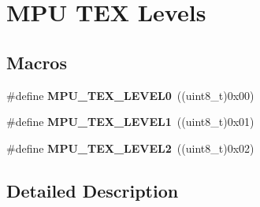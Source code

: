 \hypertarget{group___c_o_r_t_e_x___m_p_u___t_e_x___levels}{}\section{M\+PU T\+EX Levels}
\label{group___c_o_r_t_e_x___m_p_u___t_e_x___levels}
\subsection*{Macros}
\begin{DoxyCompactItemize}
\item 
\#define {\bfseries M\+P\+U\+\_\+\+T\+E\+X\+\_\+\+L\+E\+V\+E\+L0}~((uint8\+\_\+t)0x00)\hypertarget{group___c_o_r_t_e_x___m_p_u___t_e_x___levels_ga8450866a210a2ed0d4e52b4a8608072b}{}\label{group___c_o_r_t_e_x___m_p_u___t_e_x___levels_ga8450866a210a2ed0d4e52b4a8608072b}

\item 
\#define {\bfseries M\+P\+U\+\_\+\+T\+E\+X\+\_\+\+L\+E\+V\+E\+L1}~((uint8\+\_\+t)0x01)\hypertarget{group___c_o_r_t_e_x___m_p_u___t_e_x___levels_gaa02a8ff52a30d37799b1e31f2c44e685}{}\label{group___c_o_r_t_e_x___m_p_u___t_e_x___levels_gaa02a8ff52a30d37799b1e31f2c44e685}

\item 
\#define {\bfseries M\+P\+U\+\_\+\+T\+E\+X\+\_\+\+L\+E\+V\+E\+L2}~((uint8\+\_\+t)0x02)\hypertarget{group___c_o_r_t_e_x___m_p_u___t_e_x___levels_gaebca9c4b74df7d7ab394d93a7d3d879b}{}\label{group___c_o_r_t_e_x___m_p_u___t_e_x___levels_gaebca9c4b74df7d7ab394d93a7d3d879b}

\end{DoxyCompactItemize}


\subsection{Detailed Description}
